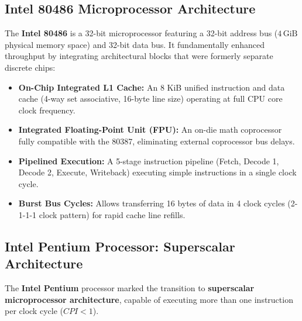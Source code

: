 \documentclass[12pt,a4paper]{article}
\begin{document}
\subsection{Intel 80486 Microprocessor Architecture}
\begin{tcolorbox}[defbox, title={Intel 80486 Architectural Integration}]
The \textbf{Intel 80486} is a 32-bit microprocessor featuring a 32-bit address bus ($4\,\mathrm{GiB}$ physical memory space) and 32-bit data bus. It fundamentally enhanced throughput by integrating architectural blocks that were formerly separate discrete chips:
\begin{itemize}[leftmargin=*]
  \item \textbf{On-Chip Integrated L1 Cache:} An 8 KiB unified instruction and data cache (4-way set associative, 16-byte line size) operating at full CPU core clock frequency.
  \item \textbf{Integrated Floating-Point Unit (FPU):} An on-die math coprocessor fully compatible with the 80387, eliminating external coprocessor bus delays.
  \item \textbf{Pipelined Execution:} A 5-stage instruction pipeline (Fetch, Decode 1, Decode 2, Execute, Writeback) executing simple instructions in a single clock cycle.
  \item \textbf{Burst Bus Cycles:} Allows transferring 16 bytes of data in 4 clock cycles (2-1-1-1 clock pattern) for rapid cache line refills.
\end{itemize}
\end{tcolorbox}

\subsection{Intel Pentium Processor: Superscalar Architecture}
\begin{tcolorbox}[defbox, title={Intel Pentium Processor Overview}]
The \textbf{Intel Pentium} processor marked the transition to \textbf{superscalar microprocessor architecture}, capable of executing more than one instruction per clock cycle ($CPI < 1$).
\end{tcolorbox}
\end{document}
